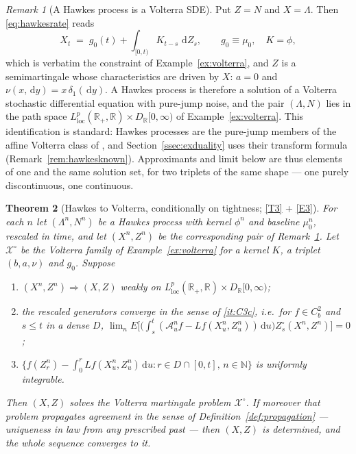 \documentclass[11pt,a4paper]{article}
\theoremstyle{plain}
\newtheorem{theorem}{Theorem}[section]
\theoremstyle{definition}
\theoremstyle{remark}
\newtheorem{remark}[theorem]{Remark}
\newcommand{\R}{\mathbb{R}}
\newcommand{\N}{\mathbb{N}}
\newcommand{\Rp}{\R_+}
\newcommand{\ALP}{\cite{ALP19}}
\newcommand{\XX}{\mathcal{X}}                  %
\newcommand{\dif}{\,\mathrm{d}}
\DeclareMathOperator*{\wto}{\Rightarrow}
\begin{document}
\begin{remark}[A Hawkes process is a Volterra SDE]
  \label{rem:hawkesisvolterra}
  Put $Z = N$ and $X = \Lambda$.  Then \eqref{eq:hawkesrate} reads
  \[
    X_t \;=\; g_0(t) + \int_{[0,t)} K_{t-s} \, \dif Z_s ,
    \qquad g_0 \equiv \mu_0 , \quad K = \phi ,
  \]
  which is verbatim the constraint of Example~\ref{ex:volterra}, and $Z$ is a
  semimartingale whose characteristics are driven by $X$: $a = 0$ and
  $\nu(x,\dif y) = x \, \delta_1(\dif y)$.  A Hawkes process is therefore a
  solution of a Volterra stochastic differential equation with pure-jump noise,
  and the pair $(\Lambda,N)$ lies in the path space
  $L^p_{\mathrm{loc}}(\Rp,\R) \times D_\R[0,\infty)$ of
  Example~\ref{ex:volterra}.  This identification is standard: Hawkes processes
  are the pure-jump members of the affine Volterra class of \ALP, and
  Section~\ref{ssec:exduality} uses their transform formula
  (Remark~\ref{rem:hawkesknown}).  Approximants and limit below are thus elements of
  one and the same solution set, for two triplets of the same shape --- one purely
  discontinuous, one continuous.
\end{remark}

\begin{theorem}[Hawkes to Volterra, conditionally on tightness; \eqref{T3} + \eqref{E3}]
  \label{thm:hawkesvolterra}
  For each $n$ let $(\Lambda^n, N^n)$ be a Hawkes process with kernel $\phi^n$ and
  baseline $\mu_0^n$, rescaled in time, and let $(X^n,Z^n)$ be the corresponding
  pair of Remark~\ref{rem:hawkesisvolterra}.  Let $\XX^\circ$ be the Volterra
  family of Example~\ref{ex:volterra} for a kernel $K$, a triplet $(b,a,\nu)$ and
  $g_0$.  Suppose
  \begin{enumerate}[label=(\alph*)]
  \item \label{it:hv_tight}
    $(X^n,Z^n) \wto (X,Z)$ weakly on $L^p_{\mathrm{loc}}(\Rp,\R) \times D_\R[0,\infty)$;
  \item \label{it:hv_gen}
    the rescaled generators converge in the sense of \ref{it:C3c}, i.e.\ for
    $f \in C^2_b$ and $s \leq t$ in a dense $D$,
    $\lim_n E\bigl[ \bigl( \int_s^t (\mathcal{A}^n_u f - Lf(X^n_u,Z^n_u)) \dif u \bigr)
      Z^\circ_s(X^n,Z^n) \bigr] = 0$;
  \item \label{it:hv_ui}
    $\{ f(Z^n_r) - \int_0^r Lf(X^n_u,Z^n_u)\dif u : r \in D \cap [0,t],\, n \in \N \}$
    is uniformly integrable.
  \end{enumerate}
  Then $(X,Z)$ solves the Volterra martingale problem $\XX^\circ$.  If moreover
  that problem propagates agreement in the sense of
  Definition~\ref{def:propagation} --- uniqueness in law from any prescribed past
  --- then
  $(X,Z)$ is determined, and the whole sequence converges to it.
\end{theorem}
\end{document}
